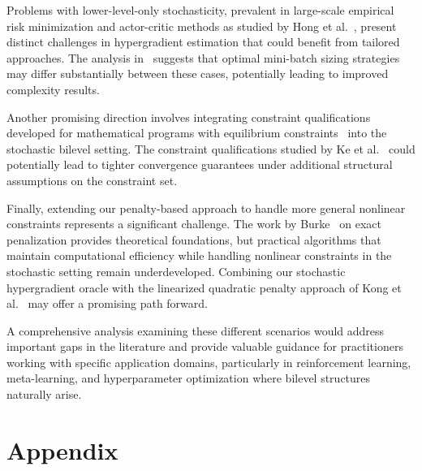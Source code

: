 \documentclass[letterpaper]{article} %
\newcommand{\1}{\mathbf{1}}
\begin{document}
Problems with lower-level-only stochasticity, prevalent in large-scale empirical risk minimization and actor-critic methods as studied by Hong et al.~\cite{hong2023}, present distinct challenges in hypergradient estimation that could benefit from tailored approaches. The analysis in~\cite{PMLR-BatchTradeoff2020} suggests that optimal mini-batch sizing strategies may differ substantially between these cases, potentially leading to improved complexity results.

Another promising direction involves integrating constraint qualifications developed for mathematical programs with equilibrium constraints~\cite{ye1995,ye2010} into the stochastic bilevel setting. The constraint qualifications studied by Ke et al.~\cite{ke2022} could potentially lead to tighter convergence guarantees under additional structural assumptions on the constraint set.

Finally, extending our penalty-based approach to handle more general nonlinear constraints represents a significant challenge. The work by Burke~\cite{burke1991} on exact penalization provides theoretical foundations, but practical algorithms that maintain computational efficiency while handling nonlinear constraints in the stochastic setting remain underdeveloped. Combining our stochastic hypergradient oracle with the linearized quadratic penalty approach of Kong et al.~\cite{OptOnlineAffine2022} may offer a promising path forward.

A comprehensive analysis examining these different scenarios would address important gaps in the literature and provide valuable guidance for practitioners working with specific application domains, particularly in reinforcement learning, meta-learning, and hyperparameter optimization where bilevel structures naturally arise.



% 


\newpage
\appendix
\onecolumn
\section{Appendix}
\end{document}
